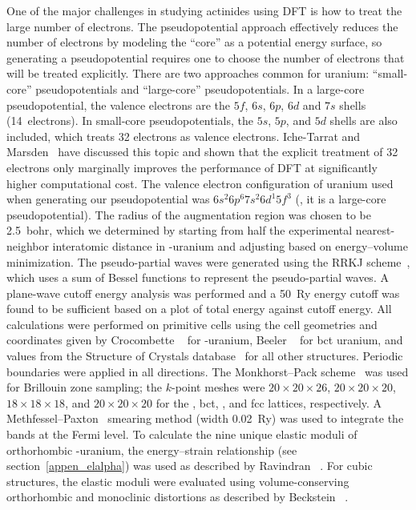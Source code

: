 One of the major challenges in studying actinides using DFT is how to treat the
large number of electrons. The pseudopotential approach effectively reduces the
number of electrons by modeling the ``core'' as a potential energy surface,
so generating a pseudopotential requires one to choose the number of electrons
that will be treated explicitly. There are two approaches common for uranium:
``small-core'' pseudopotentials and ``large-core'' pseudopotentials. In a
large-core pseudopotential, the valence electrons are the $5f$, $6s$, $6p$,
$6d$ and $7s$ shells (14~electrons). In small-core pseudopotentials, the $5s$,
$5p$, and $5d$ shells are also included, which treats 32 electrons as valence
electrons. Iche-Tarrat and Marsden~\cite{iche2008examining} have discussed this
topic and shown that the explicit treatment of 32 electrons only marginally
improves the performance of DFT at significantly higher computational cost.
The valence electron configuration of uranium used when generating our
pseudopotential was $6s^2 6p^6 7s^2 6d^1 5f^3$ (\ie, it is a large-core
pseudopotential).
The radius of the augmentation region was chosen to be 2.5~bohr,
which we determined by starting from half the experimental nearest-neighbor
interatomic distance in \mbox{\textalpha-uranium} and adjusting based on
energy--volume minimization.
The pseudo-partial waves were generated using the RRKJ
scheme~\cite{rappe1990optimized}, which uses a sum of Bessel functions to
represent the pseudo-partial waves.
A plane-wave cutoff energy analysis was performed and a 50~Ry energy cutoff was
found to be sufficient based on a plot of total energy against cutoff energy.
All calculations were performed on primitive cells using the cell geometries
and coordinates given by Crocombette \etal~\cite{crocombette2001plane} for
\textalpha-uranium, Beeler \etal~\cite{beeler2013first} for bct uranium, and
values from the Structure of Crystals database~\cite{StructureofCrystals} for
all other structures.
Periodic boundaries were applied in all directions.
The Monkhorst--Pack scheme~\cite{monkhorst1976special} was used for Brillouin zone
sampling; the $k$-point meshes were $20\times20\times26$, $20\times20\times20$,
$18\times18\times18$, and $20\times20\times20$ for the \textalpha, bct,
\textgamma, and fcc lattices, respectively. A
Methfessel--Paxton~\cite{methfessel1989high} smearing method (width 0.02~Ry)
was used to integrate the bands at the Fermi level.
To calculate the nine unique elastic moduli of orthorhombic \textalpha-uranium,
the energy--strain relationship (see section~\ref{appen_elalpha}) was used as described by Ravindran
\etal~\cite{ravindran1998density}.
For cubic structures, the elastic moduli were evaluated using
volume-conserving orthorhombic and monoclinic distortions  as described by
Beckstein \etal~\cite{beckstein2001first}.

